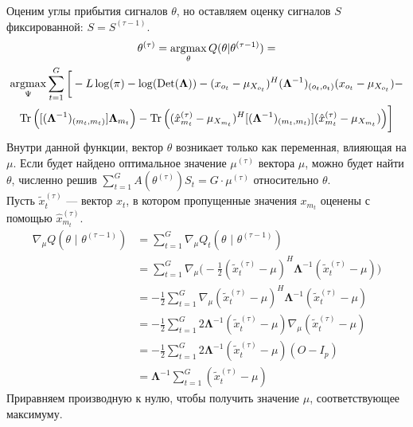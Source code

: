 \documentclass[11pt]{article}
\DeclareMathOperator*{\argmax}{argmax}
\DeclareMathOperator{\Det}{Det}
\begin{document}
\begin{center}
\fontsize{14}{18}\selectfont {}
\end{center}
Оценим углы прибытия сигналов $\theta$, но оставляем оценку сигналов $S$ фиксированной: $S = S^{(\tau-1)}$.
\begin{equation*}
\begin{gathered}
\theta^{(\tau)}= \argmax_{\theta} Q(\theta | \theta^{(\tau-1)}) = \\
\argmax_{\Psi}  \sum_{t=1}^G \bigg[ -L \log(\pi) - \log (\Det(\mathbf{\Lambda})) - (x_{o_t}-\mu_{X_{o_t}})^H (\mathbf{\Lambda}^{-1})_{(o_t, o_t)}(x_{o_t}-\mu_{X_{o_t}}) -  \\ \Tr \Big( [(\mathbf{\Lambda}^{-1})_{(m_t, m_t)}]\mathbf{\Lambda}_{m_t} \Big) - \Tr \Big((\hat{x}_{m_t}^{(\tau)} - \mu_{X_{m_t}})^H[(\mathbf{\Lambda}^{-1})_{(m_t, m_t)}](\hat{x}_{m_t}^{(\tau)} - \mu_{X_{m_t}}) \Big)  \bigg]
\end{gathered}
\end{equation*}
Внутри данной функции, вектор $\theta$ возникает только как переменная, влияющая на $\mu$. Если будет найдено оптимальное значение $\mu^{(\tau)}$ вектора $\mu$, можно будет найти $\theta$, 
численно решив $\sum_{t=1}^G A(\theta^{(\tau)})S_t = G \cdot \mu^{(\tau)}$ относительно $\theta$. \\
Пусть $\widetilde{x}_t^{(\tau)}$ --- вектор $x_t$, в котором пропущенные значения $x_{m_t}$ оценены с помощью $\hat{x}_{m_t}^{(\tau)}$.
\begin{align*}
\nabla_{\mu} Q(\theta \text{ | } \theta^{(\tau-1)}) &= \sum_{t = 1}^{G} \nabla_{\mu} Q_t (\theta \text{ | } \theta^{(\tau-1)}) \\
&= \sum_{t = 1}^{G} \nabla_{\mu} \Big( -\frac{1}{2} (\widetilde{x}_t^{(\tau)} - \mu)^H \mathbf{\Lambda}^{-1} (\widetilde{x}_t^{(\tau)} - \mu) \Big) \\
&= -\frac{1}{2} \sum_{t = 1}^{G} \nabla_{\mu} (\widetilde{x}_t^{(\tau)} - \mu)^H \mathbf{\Lambda}^{-1} (\widetilde{x}_t^{(\tau)} - \mu) \\
&= -\frac{1}{2} \sum_{t = 1}^{G} 2 \mathbf{\Lambda}^{-1} (\widetilde{x}_t^{(\tau)} - \mu) \nabla_{\mu} (\widetilde{x}_t^{(\tau)} - \mu) \\
&= -\frac{1}{2} \sum_{t = 1}^{G} 2 \mathbf{\Lambda}^{-1} (\widetilde{x}_t^{(\tau)} - \mu) (O - I_p) \\
&= \mathbf{\Lambda}^{-1} \sum_{t = 1}^{G} (\widetilde{x}_t^{(\tau)} - \mu)
\end{align*}
Приравняем производную к нулю, чтобы получить значение $\mu$, соответствующее максимуму.
\end{document}
